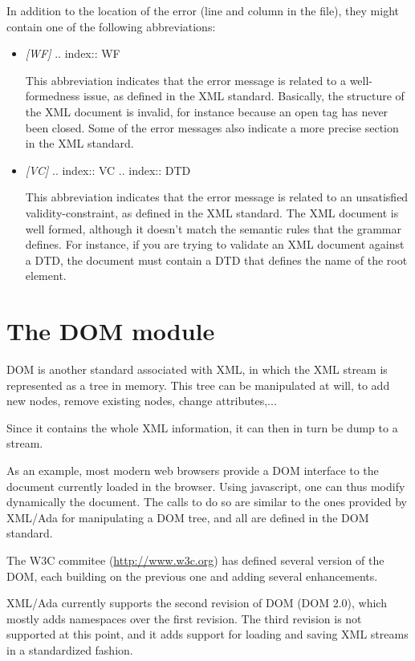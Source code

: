 \documentclass[letterpaper,10pt,english]{sphinxmanual}
\begin{document}
In addition to the location of the error (line and column in the file),
they might contain one of the following abbreviations:
\begin{itemize}
\item {} 
\emph{{[}WF{]}}
.. index:: WF

This abbreviation indicates that the error message is related to a
well-formedness issue, as defined in the XML standard. Basically, the
structure of the XML document is invalid, for instance because an
open tag has never been closed. Some of the error messages also indicate
a more precise section in the XML standard.

\item {} 
\emph{{[}VC{]}}
.. index:: VC
.. index:: DTD

This abbreviation indicates that the error message is related to an
unsatisfied validity-constraint, as defined in the XML standard. The XML
document is well formed, although it doesn't match the semantic rules
that the grammar defines. For instance, if you are trying to validate an
XML document against a DTD, the document must contain a DTD that defines the
name of the root element.

\end{itemize}


\chapter{The DOM module}
\label{dom::doc}\label{dom:the-dom-module}\label{dom:id1}
DOM is another standard associated with XML, in which the XML stream is
represented as a tree in memory. This tree can be manipulated at will, to add
new nodes, remove existing nodes, change attributes,...

Since it contains the whole XML information, it can then in turn be dump to a
stream.

As an example, most modern web browsers provide a DOM interface to the document
currently loaded in the browser. Using javascript, one can thus modify
dynamically the document. The calls to do so are similar to the ones provided
by XML/Ada for manipulating a DOM tree, and all are defined in the DOM
standard.

The W3C commitee (\href{http://www.w3c.org}{http://www.w3c.org}) has defined
several version of the DOM, each building on the previous one and adding
several enhancements.

XML/Ada currently supports the second revision of DOM (DOM 2.0), which mostly
adds namespaces over the first revision. The third revision is not supported at
this point, and it adds support for loading and saving XML streams in a
standardized fashion.
\end{document}
